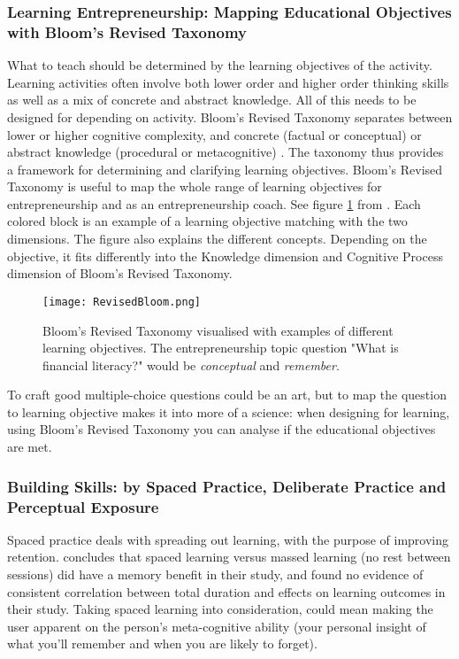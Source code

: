 
  \subsubsection{Learning Entrepreneurship: Mapping Educational Objectives with Bloom's Revised Taxonomy}

  What to teach should be determined by the learning objectives of the activity. Learning activities often involve both lower order and higher order thinking skills as well as a mix of concrete and abstract knowledge. All of this needs to be designed for depending on activity. Bloom's Revised Taxonomy \citep{krathwohl} separates between lower or higher cognitive complexity, and concrete (factual or conceptual) or abstract knowledge (procedural or metacognitive) \citep{cheong}. The taxonomy thus provides a framework for determining and clarifying learning objectives. Bloom's Revised Taxonomy is useful to map the whole range of learning objectives for entrepreneurship and as an entrepreneurship coach. See figure \ref{fig:revised-bloom} from \cite{heer}. Each colored block is an example of a learning objective matching with the two dimensions. The figure also explains the different concepts. Depending on the objective, it fits differently into the Knowledge dimension and Cognitive Process dimension of Bloom's Revised Taxonomy.

  \begin{figure}[h]
    \centering
    \texttt{[image: RevisedBloom.png]}
    \caption{Bloom's Revised Taxonomy visualised with examples of different learning objectives. The entrepreneurship topic question "What is financial literacy?" would be \textit{conceptual} and \textit{remember}. }
    \label{fig:revised-bloom}
\end{figure}

  To craft good multiple-choice questions could be an art, but to map the question to learning objective makes it into more of a science: when designing for learning, using Bloom's Revised Taxonomy you can analyse if the educational objectives are met.

  \subsubsection{Building Skills: by Spaced Practice, Deliberate Practice and Perceptual Exposure}

  Spaced practice deals with spreading out learning, with the purpose of improving retention. \cite{gates} concludes that spaced learning versus massed learning (no rest between sessions) did have a memory benefit in their study, and found no evidence of consistent correlation between total duration and effects on learning outcomes in their study. Taking spaced learning into consideration, could mean making the user apparent on the person's meta-cognitive ability (your personal insight of what you'll remember and when you are likely to forget).

